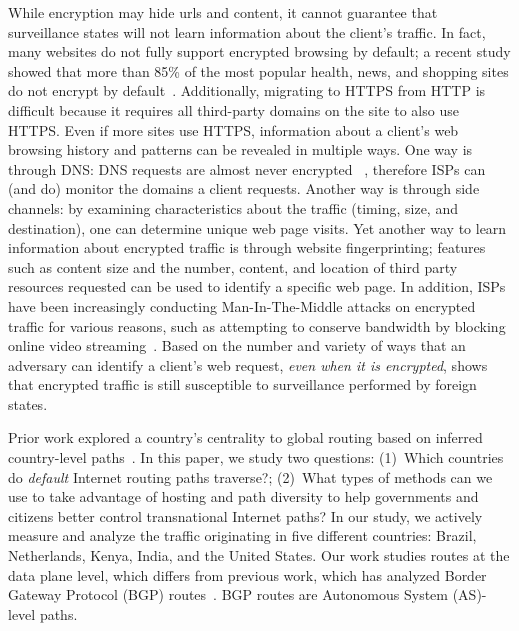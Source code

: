 While encryption may hide urls and content, it cannot guarantee that surveillance 
states will not learn information about the client's traffic.  In fact, many websites do not fully support 
encrypted browsing by default; a recent study showed that more than 85\% of the most popular 
health, news, and shopping sites do not encrypt by default~\cite{what_isps_can_see}.  Additionally, migrating 
to HTTPS from HTTP is difficult because it requires all third-party domains on the site to also use 
HTTPS.  Even if more sites use HTTPS, information about a client's web browsing history and patterns 
can be revealed in multiple ways. One way is through DNS: DNS requests are almost never encrypted ~\cite{what_isps_can_see}, therefore 
ISPs can (and do) monitor the domains a client requests.  Another way is through side channels: by examining 
characteristics about the traffic (timing, size, and destination), one can determine unique web page visits.  
Yet another way to learn information about encrypted traffic is through website fingerprinting; features 
such as content size and the number, content, and location of third party resources requested can be used to 
identify a specific web page.  In addition, ISPs have been increasingly conducting Man-In-The-Middle attacks on 
encrypted traffic for various reasons, such as attempting to conserve bandwidth by blocking online video streaming~\cite{mitm_isp}.  
Based on the number and variety of ways that an adversary can identify a client's web request, \textit{even when it is encrypted}, 
shows that encrypted traffic is still susceptible to surveillance performed by foreign states.

Prior work explored a country's centrality to global routing based on 
inferred country-level paths~\cite{karlin2009nation}. 
In this paper, we study two questions: (1)~Which countries do {\em
  default} Internet routing paths traverse?; (2)~What types of methods
can we use to take advantage of hosting and path diversity to help governments
and citizens better control transnational Internet paths? 
In our study, we actively measure and analyze the traffic originating in
five different countries: Brazil, Netherlands, Kenya, India, and the
United States.  Our work studies routes at the data plane level, which differs from 
 previous work, which has analyzed Border Gateway Protocol (BGP) routes~\cite{karlin2009nation,shah2015characterizing}.  
BGP routes are Autonomous System (AS)-level paths.

